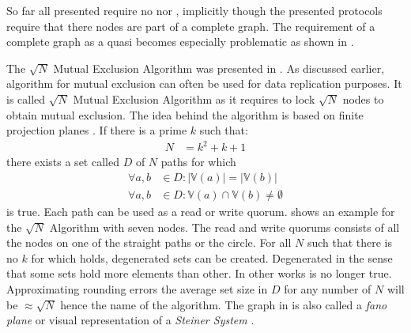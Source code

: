 \documentclass[conference]{IEEEtran}
\begin{document}
So far all presented  require no  nor , implicitly though
the presented protocols require that there nodes are part of a complete graph.
The requirement of a complete graph as a quasi  becomes especially
problematic as shown in .

The \(\sqrt{N}\) Mutual Exclusion Algorithm was presented in \cite{Mae85:ame}.
As discussed earlier, algorithm for mutual exclusion can often be used for data
replication purposes.
It is called \(\sqrt{N}\) Mutual Exclusion Algorithm as it requires to lock
\(\sqrt{N}\) nodes to obtain mutual exclusion.
The idea behind the algorithm is based on finite projection planes
\cite{AARS:ProjectionPlane}.
If there is a prime \(k\) such that:
\begin{align}
	N &= k^2 + k + 1 \label{eq:nsqrtk}
\end{align}
there exists a set called \(D\) of \(N\) paths for which
\begin{align}
	\forall a,b &\in D : |\mathbb{V}(a)| = |\mathbb{V}(b)| \label{eq:nsqrtequal}\\
	\forall a,b &\in D : \mathbb{V}(a) \cap \mathbb{V}{(b)} \ne \emptyset \label{eq:nsqrt}
\end{align}
is true.
Each path can be used as a read or write quorum.
 shows an example for the \(\sqrt{N}\) Algorithm with seven
nodes.
The read and write quorums consists of all the nodes on one of the straight
paths or the circle.
For all \(N\) such that there is no \(k\) for which  holds,
degenerated sets can be created.
Degenerated in the sense that some sets hold more elements than other.
In other works  is no longer true.
Approximating rounding errors the average set size in \(D\) for any number of
\(N\) will be \(\approx \sqrt{N}\) hence the name of the algorithm.
The graph in  is also called a \emph{fano plane} or visual
representation of a \emph{Steiner System} \cite{assmus93steiner,Manivel06fano}.
\end{document}
